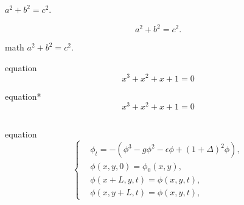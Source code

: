 \documentclass{article}
\begin{document}
    \subsection{ }

    





    \newpage
    \section{ }
    \markboth{\text{ }\thesection\text{ } \quad  }{\text{ }\thesection\text{ } \quad  }  


    \subsection{ }
     $a^2+b^2=c^2$.%

     $$a^2+b^2=c^2.$$%

     math %
    \begin{math}
        a^2+b^2=c^2.
    \end{math}

    equation 
    \begin{equation}%
        x^3+x^2+x+1=0
    \end{equation}

    equation* 
    \begin{equation*}%
        x^3+x^2+x+1=0
        \tag{2.1}
    \end{equation*}

    \subsection{ }
     equation 
    \begin{equation}
    \label{f1}%
        \left\{ %
        \begin{aligned}
            &\phi _t =-(\phi^3 -g\phi ^2-\epsilon \phi +(1+\Delta  )^2 \phi),\\
            &\phi(x,y,0)=\phi_0(x,y),\\
            &\phi (x+L,y,t)=\phi(x,y,t),\\
            &\phi (x,y+L,t)=\phi (x,y,t),
        \end{aligned}
		\right.\tag{2.2}
    \end{equation}
\end{document}
